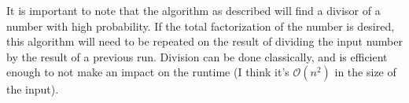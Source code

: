 \documentclass{exam} %
\theoremstyle{plain}
\theoremstyle{definition}
\theoremstyle{remark}
\numberwithin{equation}{section}  %
\renewcommand{\O}{\mathcal{O}}
\begin{document}
It is important to note that the algorithm as described will find a divisor of a number
with high probability. If the total factorization of the number is desired, this
algorithm will need to be repeated on the result of dividing the input number by
the result of a previous run. Division can be done classically, and is efficient
enough to not make an impact on the runtime (I think it's $\O({n^2})$ in the
size of the input).\\
\end{document}
